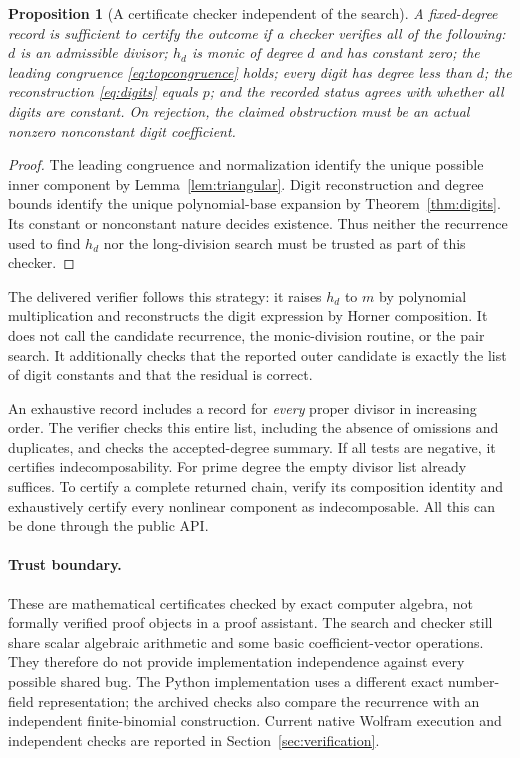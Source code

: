 \documentclass[11pt,a4paper]{article}
\numberwithin{equation}{section}
\newtheorem{proposition}[theorem]{Proposition}
\theoremstyle{definition}
\theoremstyle{remark}
\begin{document}
\begin{proposition}[A certificate checker independent of the search]
\label{prop:checker}
A fixed-degree record is sufficient to certify the outcome if a checker
verifies all of the following: $d$ is an admissible divisor; $h_d$ is monic
of degree $d$ and has constant zero; the leading congruence
\eqref{eq:topcongruence} holds; every digit has degree less than $d$; the
reconstruction \eqref{eq:digits} equals $p$; and the recorded status agrees
with whether all digits are constant. On rejection, the claimed obstruction
must be an actual nonzero nonconstant digit coefficient.
\end{proposition}
\begin{proof}
The leading congruence and normalization identify the unique possible inner
component by Lemma~\ref{lem:triangular}. Digit reconstruction and degree bounds
identify the unique polynomial-base expansion by Theorem~\ref{thm:digits}.
Its constant or nonconstant nature decides existence. Thus neither the
recurrence used to find $h_d$ nor the long-division search must be trusted as
part of this checker.
\end{proof}

The delivered verifier follows this strategy: it raises $h_d$ to $m$ by
polynomial multiplication and reconstructs the digit expression by Horner
composition. It does not call the candidate recurrence, the monic-division
routine, or the pair search. It additionally checks that the reported outer
candidate is exactly the list of digit constants and that the residual is
correct.

An exhaustive record includes a record for \emph{every} proper divisor in
increasing order. The verifier checks this entire list, including the absence
of omissions and duplicates, and checks the accepted-degree summary. If all
tests are negative, it certifies indecomposability. For prime degree the
empty divisor list already suffices. To certify a complete returned chain,
verify its composition identity and exhaustively certify every nonlinear
component as indecomposable. All this can be done through the public API.

\paragraph{Trust boundary.}
These are mathematical certificates checked by exact computer algebra, not
formally verified proof objects in a proof assistant. The search and checker
still share scalar algebraic arithmetic and some basic coefficient-vector
operations. They therefore do not provide implementation independence against
every possible shared bug. The Python implementation uses a different exact number-field
representation; the archived checks also compare the recurrence with an
independent finite-binomial construction. Current native Wolfram execution
and independent checks are reported in Section~\ref{sec:verification}.
\end{document}
